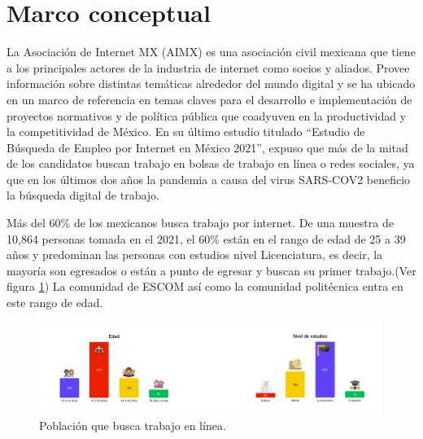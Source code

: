 \clearpage
\section{Marco conceptual}

La Asociación de Internet MX (AIMX) es una asociación civil mexicana que tiene a los principales actores de la industria  de internet como socios y aliados. Provee información sobre distintas temáticas alrededor del mundo digital y se ha ubicado  en un marco de referencia en temas claves para el desarrollo e implementación de proyectos normativos y de política pública  que coadyuven en la productividad y la competitividad de México.\cite{amiz1}
En su último  estudio titulado ``Estudio de Búsqueda de Empleo por Internet en México 2021'', expuso que más de la mitad de los candidatos buscan trabajo en bolsas de trabajo en línea o redes sociales, ya que en los últimos dos años la pandemia a causa del virus SARS-COV2 beneficio la búsqueda digital de trabajo.\cite{AIMX}\\
    \newline

   
Más del 60\% de los mexicanos busca trabajo por internet. De una muestra de 10,864 personas tomada en el 2021, el 60\% están en el rango de edad de 25 a 39 años y predominan las personas con estudios nivel Licenciatura, es decir, la mayoría son egresados o están a punto de egresar y buscan su primer  trabajo.(Ver figura \ref{mark:pob}) 
La comunidad de ESCOM así como la comunidad politécnica entra en este rango de edad.  
\begin{figure}[H]
        \begin{center}
            \includegraphics[width=.9\textwidth]{antecedentes/imagenes/porcen.jpeg}
        \end{center}
        \caption{Población que busca trabajo en línea.}
        \label{mark:pob}
    \end{figure}
    
